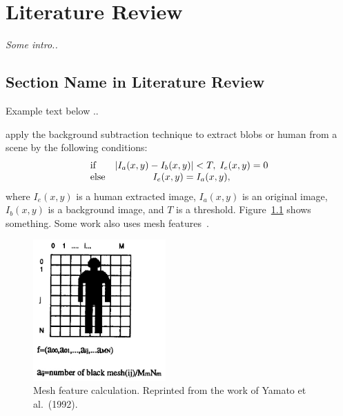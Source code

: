 \setlength{\footskip}{8mm}

\chapter{Literature Review} 
\label{ch:literature-review}

\textit{Some intro..}

\section{Section Name in Literature Review}
\label{section-name-in-literature-review}

Example text below ..

apply the background subtraction 
technique to extract blobs or human from a scene by the 
following conditions:
\[
\begin{array}{lc}
  {\rm if} & \left|{I_a (x,y) - I_b (x,y)}\right|< T,\;I_e (x,y) = 0 \\ 
  {\rm else} & I_e (x,y) = I_a (x,y), 
\end{array}
\]
where $I_e (x,y)$ is a human extracted image, $I_a (x,y)$ is an
original image, $I_b (x,y)$ is a background image, and $T$ is a
threshold. Figure~\ref{fig:mesh-feature} shows something. Some work also uses 
mesh features~.


\begin{figure}[t]
  \centering
  \includegraphics[width=2in]{figures/mesh-feature.jpg}  
  \caption[Mesh feature calculation]{Mesh feature
    calculation. Reprinted from the work of Yamato et al.\ (1992).}
  \label{fig:mesh-feature}
\end{figure}

\FloatBarrier

